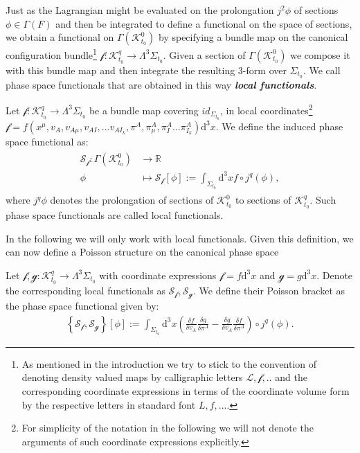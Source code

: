 Just as the Lagrangian might be evaluated on the prolongation $j^2\phi$ of sections $\phi \in \Gamma(F)$ and then be integrated to define a functional on the space of sections, we obtain a functional on $\Gamma(\mathcal{K}^0_{t_0})$ by specifying a bundle map on the canonical configuration bundle\footnote{As mentioned in the introduction we try to stick to the convention of denoting density valued maps by calligraphic letters $\mathcal{L}, \mathcal{f},..$ and the corresponding coordinate expressions in terms of the coordinate volume form by the respective letters in standard font $L,f,...$.} $\mathcal{f}: \mathcal{K}^q_{t_0} \rightarrow \Lambda^3\Sigma_{t_0}$. Given a section of $\Gamma(\mathcal{K}^0_{t_0})$ we compose it with this bundle map and then integrate the resulting 3-form over $\Sigma_{t_0}$. We call phase space functionals that are obtained in this way \textit{\textbf{local functionals}}.  
\begin{definition}
Let $\mathcal{f}: \mathcal{K}^q_{t_0} \rightarrow \Lambda^3\Sigma_{t_0} $ be a bundle map covering $id_{\Sigma_{t_0}}$, in local coordinates\footnote{For simplicity of the notation in the following we will not denote the arguments of such coordinate expressions explicitly.} $\mathcal{f} = f(x^{\mu},v_A,v_{A\mu},v_{AI}, ... v_{AI_k},\pi^A,\pi^A _{\mu}, \pi^A_I ... \pi^A_{I_k})\mathrm{d}^3x$. We define the induced phase space functional as:
\begin{align}
\begin{aligned}
    \mathcal{S}_{\mathcal{f}} : \Gamma(\mathcal{K}^0_{t_0}) &\longrightarrow \mathbb{R}\\
    \phi &\longmapsto \mathcal{S}_{\mathcal{f}}[\phi] := \int_{\Sigma_{t_0}} \mathrm{d}^3x f \circ j^q(\phi),
\end{aligned}
\end{align}
where $j^q\phi$ denotes the prolongation of sections of $\mathcal{K}^0_{t_0}$ to sections of $\mathcal{K}^q_{t_0}$. Such phase space functionals are called local functionals.
\end{definition}
In the following we will only work with local functionals. 
Given this definition, we can now define a Poisson structure on the canonical phase space 
\begin{definition}
Let $\mathcal{f},\mathcal{g} : \mathcal{K}^q_{t_0} \rightarrow \Lambda^3\Sigma_{t_0} $ with coordinate expressions $\mathcal{f} = f\mathrm{d}^3x$ and $\mathcal{g} = g\mathrm{d}^3x$. Denote the corresponding local functionals as $\mathcal{S}_{\mathcal{f}}, \mathcal{S}_{\mathcal{g}}$. We define their Poisson bracket as the phase space functional given by:
\begin{align}
\left \{ \mathcal{S}_{\mathcal{f}}, \mathcal{S}_{\mathcal{g}} \right \}[\phi] := \int _{\Sigma_{t_0}} \mathrm{d}^3x \left ( \frac{\delta f}{\delta v_A} \frac{\delta g}{\delta \pi^A} - \frac{\delta g}{\delta v_A} \frac{\delta f}{\delta \pi^A}     \right ) \circ j^q(\phi)  .
\end{align}
\end{definition}
